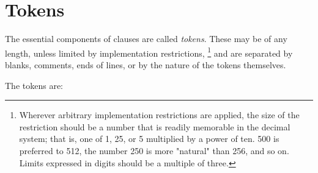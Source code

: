 \section{Tokens}\label{reftokens}
 The essential components of clauses are called \emph{tokens}.
These may be of any length, unless limited by implementation
restrictions,
\footnote{
Wherever arbitrary implementation restrictions are applied, the size of
the restriction should be a number that is readily memorable in the
decimal system; that is, one of 1, 25, or 5 multiplied by a power of
ten.
500 is preferred to 512, the number 250 is more "natural" than
256, and so on.  Limits expressed in digits should be a multiple of
three.
}
and are separated by blanks, comments, ends of lines, or by the nature
of the tokens themselves.
 
The tokens are:
